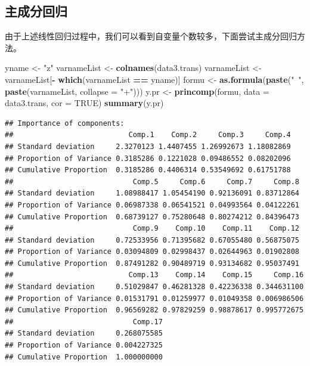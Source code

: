 \documentclass[]{article}
\newenvironment{Shaded}{\begin{snugshade}}{\end{snugshade}}
\newcommand{\KeywordTok}[1]{\textcolor[rgb]{0.13,0.29,0.53}{\textbf{#1}}}
\newcommand{\DataTypeTok}[1]{\textcolor[rgb]{0.13,0.29,0.53}{#1}}
\newcommand{\StringTok}[1]{\textcolor[rgb]{0.31,0.60,0.02}{#1}}
\newcommand{\OtherTok}[1]{\textcolor[rgb]{0.56,0.35,0.01}{#1}}
\newcommand{\OperatorTok}[1]{\textcolor[rgb]{0.81,0.36,0.00}{\textbf{#1}}}
\newcommand{\NormalTok}[1]{#1}
\begin{document}
\subsection{主成分回归}

由于上述线性回归过程中，我们可以看到自变量个数较多，下面尝试主成分回归方法。

\begin{Shaded}
\begin{Highlighting}[]
\NormalTok{yname <-}\StringTok{ "z"}
\NormalTok{varnameList <-}\StringTok{ }\KeywordTok{colnames}\NormalTok{(data3.trans)}
\NormalTok{varnameList <-}\StringTok{ }\NormalTok{varnameList[}\OperatorTok{-}\StringTok{ }\KeywordTok{which}\NormalTok{(varnameList }\OperatorTok{==}\StringTok{ }\NormalTok{yname)]}
\NormalTok{formu <-}\StringTok{ }\KeywordTok{as.formula}\NormalTok{(}\KeywordTok{paste}\NormalTok{(}\StringTok{"~"}\NormalTok{, }\KeywordTok{paste}\NormalTok{(varnameList, }\DataTypeTok{collapse =} \StringTok{"+"}\NormalTok{)))}
\NormalTok{y.pr <-}\StringTok{ }\KeywordTok{princomp}\NormalTok{(formu, }\DataTypeTok{data =}\NormalTok{ data3.trans, }\DataTypeTok{cor =} \OtherTok{TRUE}\NormalTok{)}
\KeywordTok{summary}\NormalTok{(y.pr)}
\end{Highlighting}
\end{Shaded}

\begin{verbatim}
## Importance of components:
##                           Comp.1    Comp.2     Comp.3     Comp.4
## Standard deviation     2.3270123 1.4407455 1.26992673 1.18082869
## Proportion of Variance 0.3185286 0.1221028 0.09486552 0.08202096
## Cumulative Proportion  0.3185286 0.4406314 0.53549692 0.61751788
##                            Comp.5     Comp.6     Comp.7     Comp.8
## Standard deviation     1.08988417 1.05454190 0.92136091 0.83712864
## Proportion of Variance 0.06987338 0.06541521 0.04993564 0.04122261
## Cumulative Proportion  0.68739127 0.75280648 0.80274212 0.84396473
##                            Comp.9    Comp.10    Comp.11    Comp.12
## Standard deviation     0.72533956 0.71395682 0.67055480 0.56875075
## Proportion of Variance 0.03094809 0.02998437 0.02644963 0.01902808
## Cumulative Proportion  0.87491282 0.90489719 0.93134682 0.95037491
##                           Comp.13    Comp.14    Comp.15     Comp.16
## Standard deviation     0.51029847 0.46281328 0.42236338 0.344631100
## Proportion of Variance 0.01531791 0.01259977 0.01049358 0.006986506
## Cumulative Proportion  0.96569282 0.97829259 0.98878617 0.995772675
##                            Comp.17
## Standard deviation     0.268075585
## Proportion of Variance 0.004227325
## Cumulative Proportion  1.000000000
\end{verbatim}
\end{document}
